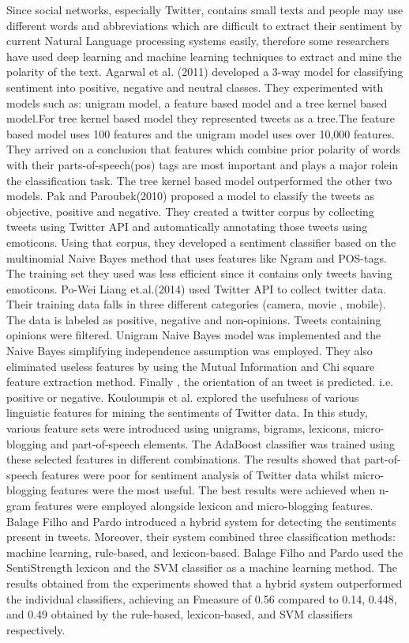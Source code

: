 \documentclass{article}
\begin{document}
Since social networks, especially Twitter, contains small texts and people may use different words and abbreviations which are difficult to extract their sentiment by current Natural Language processing systems easily, therefore some researchers have used deep learning and machine learning techniques to extract and mine the polarity of the text. Agarwal et al. (2011) \cite{agarwal2011sentiment} developed a 3-way model for classifying sentiment into positive, negative and neutral classes. They experimented with models such as: unigram model, a feature based model and a tree kernel based model.For tree kernel based model they represented tweets as a tree.The feature based model uses 100 features and the unigram model uses over 10,000 features. They arrived on a conclusion that features which combine prior polarity of words with their parts-of-speech(pos) tags are most important and plays a major rolein the classification task. The tree kernel based model outperformed the other two models. Pak and Paroubek(2010) \cite{pak2010twitter} proposed a model to classify the tweets as objective, positive and negative. They created a twitter corpus by collecting tweets using Twitter API and automatically annotating those tweets using emoticons. Using that corpus, they developed a sentiment classifier based on the multinomial Naive Bayes method that uses features like Ngram and POS-tags. The training set they used was less efficient since it contains only tweets having emoticons. Po-Wei Liang et.al.(2014) \cite{liang2013opinion} used Twitter API to collect twitter data. Their training data falls in three different categories (camera, movie , mobile). The data is labeled as positive, negative and non-opinions. Tweets containing opinions were filtered. Unigram Naive Bayes model was implemented and the Naive Bayes simplifying independence assumption was employed. They also eliminated useless features by using the Mutual Information and Chi square feature extraction method. Finally , the orientation of an tweet is predicted. i.e. positive or negative. Kouloumpis et al. \cite{kouloumpis2011twitter} explored the usefulness of various linguistic features for mining the sentiments of Twitter data. In this study, various feature sets were introduced using unigrams, bigrams, lexicons, micro-blogging and part-of-speech elements. The AdaBoost classifier was trained using these selected features in different combinations. The results showed that part-of-speech features were poor for sentiment analysis of Twitter data whilst micro-blogging features were the most useful. The best results were achieved
when n-gram features were employed alongside lexicon and micro-blogging features.
Balage Filho and Pardo \cite{ghiassi2013twitter} introduced a hybrid system for
detecting the sentiments present in tweets. Moreover, their system combined three classification methods: machine learning, rule-based, and lexicon-based. Balage Filho and Pardo \cite{ghiassi2013twitter} used the SentiStrength lexicon and the SVM
classifier as a machine learning method. The results obtained from the experiments showed that a hybrid system outperformed the individual classifiers, achieving an Fmeasure of 0.56 compared to 0.14, 0.448, and 0.49 obtained by the rule-based, lexicon-based, and SVM classifiers respectively.
\end{document}
